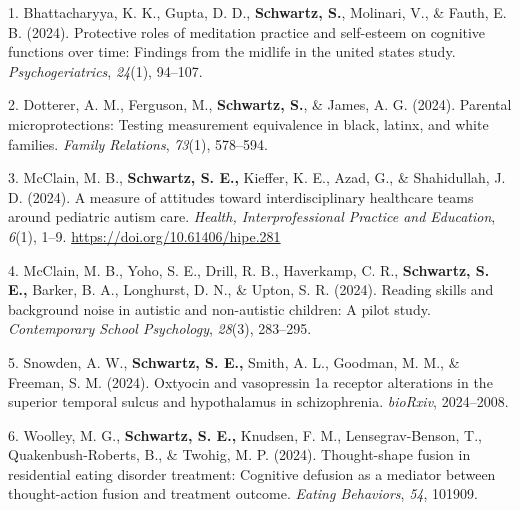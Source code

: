 \documentclass[11pt,a4paper,]{moderncv}
\newlength{\cslhangindent}
\newenvironment{CSLReferences}[2] %
 {\begin{list}{}{%
  \setlength{\itemindent}{0pt}
  \setlength{\leftmargin}{0pt}
  \setlength{\parsep}{0pt}
  \ifodd #1
   \setlength{\leftmargin}{\cslhangindent}
   \setlength{\itemindent}{-1\cslhangindent}
  \fi
  \setlength{\itemsep}{#2\baselineskip}}}
 {\end{list}}
\begin{document}
\label{refs-81d071629b6d69ed69daeb6602c923ea}
\begin{CSLReferences}{1}{0}
1. Bhattacharyya, K. K., Gupta, D. D., \textbf{Schwartz, S.}, Molinari,
V., \& Fauth, E. B. (2024). Protective roles of meditation practice and
self-esteem on cognitive functions over time: Findings from the midlife
in the united states study. \emph{Psychogeriatrics}, \emph{24}(1),
94--107.

2. Dotterer, A. M., Ferguson, M., \textbf{Schwartz, S.}, \& James, A. G.
(2024). Parental microprotections: Testing measurement equivalence in
black, latinx, and white families. \emph{Family Relations},
\emph{73}(1), 578--594.

3. McClain, M. B., \textbf{Schwartz, S. E.,} Kieffer, K. E., Azad, G.,
\& Shahidullah, J. D. (2024). A measure of attitudes toward
interdisciplinary healthcare teams around pediatric autism care.
\emph{Health, Interprofessional Practice and Education}, \emph{6}(1),
1--9. \url{https://doi.org/10.61406/hipe.281}

4. McClain, M. B., Yoho, S. E., Drill, R. B., Haverkamp, C. R.,
\textbf{Schwartz, S. E.,} Barker, B. A., Longhurst, D. N., \& Upton, S.
R. (2024). Reading skills and background noise in autistic and
non-autistic children: A pilot study. \emph{Contemporary School
Psychology}, \emph{28}(3), 283--295.

5. Snowden, A. W., \textbf{Schwartz, S. E.,} Smith, A. L., Goodman, M.
M., \& Freeman, S. M. (2024). Oxtyocin and vasopressin 1a receptor
alterations in the superior temporal sulcus and hypothalamus in
schizophrenia. \emph{bioRxiv}, 2024--2008.

6. Woolley, M. G., \textbf{Schwartz, S. E.,} Knudsen, F. M.,
Lensegrav-Benson, T., Quakenbush-Roberts, B., \& Twohig, M. P. (2024).
Thought-shape fusion in residential eating disorder treatment: Cognitive
defusion as a mediator between thought-action fusion and treatment
outcome. \emph{Eating Behaviors}, \emph{54}, 101909.

\end{CSLReferences}

\endgroup

\vspace{7mm}
\end{document}
